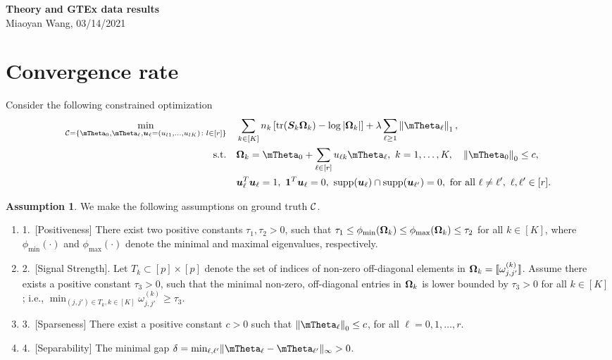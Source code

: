 \documentclass[11pt]{article}
\theoremstyle{plain}
\theoremstyle{definition}
\newtheorem{ass}{Assumption}
\begin{document}
\begin{center}
{\bf \Large Theory and GTEx data results}\\
Miaoyan Wang, 03/14/2021
\end{center}
\section{Convergence rate}
Consider the following constrained optimization
\begin{align}\label{eq:opt}
\min_{\tC=\{\mTheta_0, \mTheta_\ell, \bmu_\ell=(u_{l1},\ldots,u_{lK})\colon l\in[r]\}}\quad &\sum_{k\in[K]}n_k \left[\text{tr}(\mS_k\mOmega_k)-\log|\mOmega_k|\right]+\lambda\sum_{\ell\geq 1}\onenorm{\mTheta_\ell},\notag \\
\text{s.t.}\quad & \mOmega_k=\mTheta_0+\sum_{\ell\in[r]}u_{\ell k}\mTheta_\ell,\ k=1,\ldots,K,\quad \zeronorm{\mTheta_0}\leq c,\notag\\
& \bmu^T_\ell\bmu_\ell=1,\ \mathbf{1}^T\bmu_\ell=0,\ \text{supp}(\bmu_\ell)\cap \text{supp}(\bmu_{\ell'})=0,\ \text{for all }\ell\neq \ell',\ \ell,\ell'\in[r].
\end{align}

\begin{ass}\label{ass:main}We make the following assumptions on ground truth $\mathcal{C}$. 
\begin{enumerate}[wide, labelwidth=!, labelindent=0pt]
\item[] 1.\ [Positiveness] There exist two positive constants $\tau_1,\tau_2>0$, such that $\tau_1\leq \phi_{\min}(\bm \Omega_k)\leq \phi_{\max}(\bm \Omega_k)\leq \tau_2$ for all $k\in[K]$, where $\phi_{\min}(\cdot)$ and $\phi_{\max}(\cdot)$ denote the minimal and maximal eigenvalues, respectively. 
\item[] 2.\ [Signal Strength]. Let $T_k\subset[p]\times[p]$ denote the set of indices of non-zero off-diagonal elements in $\bm \Omega_k=\llbracket \omega^{(k)}_{j,j'} \rrbracket$. Assume there exists a positive constant $\tau_3>0$, such that the minimal non-zero, off-diagonal entries in $\bm \Omega_k$ is lower bounded by $\tau_3>0$ for all $k\in[K]$; i.e., $\min_{(j,j')\in T_k, k\in[K]}\omega^{(k)}_{j,j'}\geq \tau_3$.
\item[] 3.\ [Sparseness] There exist a positive constant $c>0$ such that $\zeronorm{\mTheta_\ell}\leq c$, for all $\ell=0,1,\ldots,r$.
\item[] 4.\ [Separability] The minimal gap $\delta=\min_{\ell,\ell'}\mnormSize{}{\mTheta_\ell-\mTheta_{\ell'}}>0$. 
\end{enumerate}
\end{ass}
\end{document}
